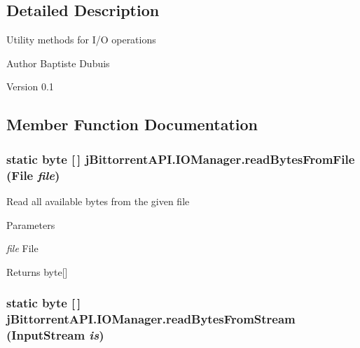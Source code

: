 \subsection{Detailed Description}
Utility methods for I/O operations

\begin{DoxyAuthor}{Author}
Baptiste Dubuis 
\end{DoxyAuthor}
\begin{DoxyVersion}{Version}
0.1 
\end{DoxyVersion}


\subsection{Member Function Documentation}
\hypertarget{classj_bittorrent_a_p_i_1_1_i_o_manager_a65bcc486d524bd6d903d59ed0d8b7147}{
\subsubsection[{readBytesFromFile}]{\setlength{\rightskip}{0pt plus 5cm}static byte \mbox{[}$\,$\mbox{]} jBittorrentAPI.IOManager.readBytesFromFile (File {\em file})}}
\label{classj_bittorrent_a_p_i_1_1_i_o_manager_a65bcc486d524bd6d903d59ed0d8b7147}
Read all available bytes from the given file 
\begin{DoxyParams}{Parameters}
\item[{\em file}]File \end{DoxyParams}
\begin{DoxyReturn}{Returns}
byte\mbox{[}\mbox{]} 
\end{DoxyReturn}
\hypertarget{classj_bittorrent_a_p_i_1_1_i_o_manager_a5e79391798ed25d06a99845b7ea4a8c1}{
\subsubsection[{readBytesFromStream}]{\setlength{\rightskip}{0pt plus 5cm}static byte \mbox{[}$\,$\mbox{]} jBittorrentAPI.IOManager.readBytesFromStream (InputStream {\em is})}}
